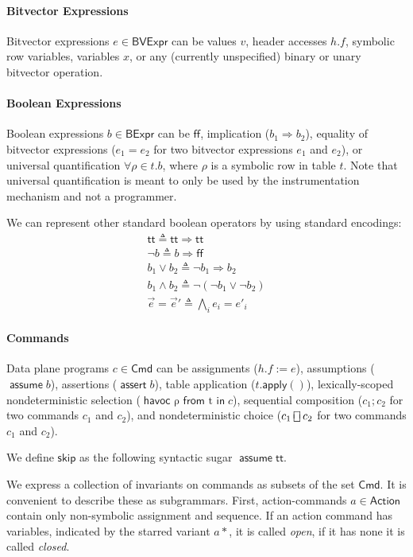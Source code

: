 \documentclass{article}
\newcommand{\TRUE}{\mathsf{tt}}
\newcommand{\FALSE}{\mathsf{ff}}
\newcommand{\BVExpr}{\mathsf{BVExpr}}
\newcommand{\BExpr}{\mathsf{BExpr}}
\newcommand{\Cmd}{\mathsf{Cmd}}
\newcommand{\Action}{\mathsf{Action}}
\newcommand{\assert}{\mathop{\mathsf{assert}}}
\newcommand{\assume}{\mathop{\mathsf{assume}}}
\newcommand{\apply}{\mathsf{apply}}
\newcommand{\choiceop}{\rotatebox[origin=c]{90}{$\sqsubset\!\!\!\sqsupset$}}
\newcommand{\choice}{\mathbin{\choiceop}}
\renewcommand{\choose}[2]{\mathop{\mathsf{havoc}~#1~\mathsf{from}~#2~\mathsf{in}}}
\newcommand{\SKIP}{\mathsf{skip}}
\begin{document}
\paragraph{Bitvector Expressions}
Bitvector expressions $e \in \BVExpr$ can be values $v$, header accesses $h.f$,
symbolic row variables, variables $x$, or any
(currently unspecified) binary or unary bitvector operation.

\paragraph{Boolean Expressions}
Boolean expressions $b \in \BExpr$ can be $\FALSE$, implication ($b_1
\Rightarrow b_2$), equality of bitvector expressions ($e_1 = e_2$ for two
bitvector expressions $e_1$ and $e_2$), or universal quantification $\forall
\rho \in t. b$, where $\rho$ is a symbolic row in table $t$. Note that universal
quantification is meant to only be used by the instrumentation mechanism and not
a programmer.

We can represent other standard boolean operators by using standard encodings:
\[\begin{array}{l}
  \TRUE \triangleq \TRUE \Rightarrow \TRUE \\
  \neg b \triangleq b \Rightarrow \FALSE \\
  b_1 \vee b_2 \triangleq \neg b_1 \Rightarrow b_2 \\
  b_1 \wedge b_2 \triangleq \neg(\neg b_1 \vee \neg b_2) \\
  \vec e = \vec e' \triangleq \bigwedge_i e_i = e'_i
\end{array}\]

\paragraph{Commands}
Data plane programs $c \in \mathsf{Cmd}$ can be assignments ($h.f := e$),
assumptions ($\assume b$), assertions ($\assert b$), table application
($t.\apply()$), lexically-scoped nondeterministic selection ($\choose \rho t
c$), sequential composition ($c_1;c_2$ for two commands $c_1$ and $c_2$), and
nondeterministic choice ($c_1 \choice c_2$ for two commands $c_1$ and $c_2$).

We define $\SKIP$ as the following syntactic sugar $\assume \TRUE$.

We express a collection of invariants on commands as subsets of the set $\Cmd$.
It is convenient to describe these as subgrammars. First, action-commands $a \in
\Action$ contain only non-symbolic assignment and sequence. If an action
command has variables, indicated by the starred variant $a*$, it is called
\emph{open}, if it has none it is called \emph{closed}.
\end{document}
